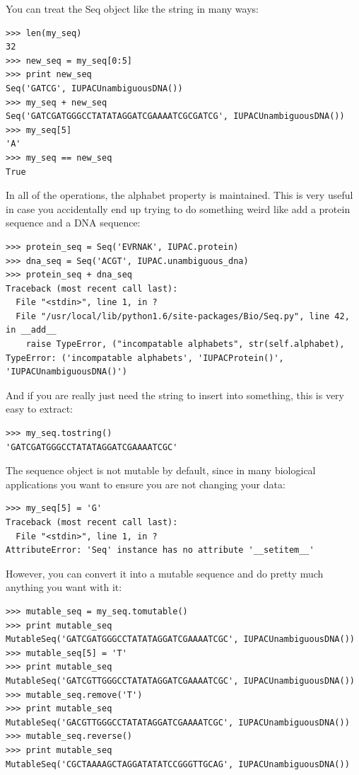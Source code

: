 \documentclass{report}
\begin{document}
You can treat the Seq object like the string in many ways:

\begin{verbatim}
>>> len(my_seq)
32
>>> new_seq = my_seq[0:5]
>>> print new_seq
Seq('GATCG', IUPACUnambiguousDNA())
>>> my_seq + new_seq
Seq('GATCGATGGGCCTATATAGGATCGAAAATCGCGATCG', IUPACUnambiguousDNA())
>>> my_seq[5]
'A'
>>> my_seq == new_seq
True
\end{verbatim}

In all of the operations, the alphabet property is maintained. This is very useful in case you accidentally end up trying to do something weird like add a protein sequence and a DNA sequence:

\begin{verbatim}
>>> protein_seq = Seq('EVRNAK', IUPAC.protein)
>>> dna_seq = Seq('ACGT', IUPAC.unambiguous_dna)
>>> protein_seq + dna_seq
Traceback (most recent call last):
  File "<stdin>", line 1, in ?
  File "/usr/local/lib/python1.6/site-packages/Bio/Seq.py", line 42, in __add__
    raise TypeError, ("incompatable alphabets", str(self.alphabet),
TypeError: ('incompatable alphabets', 'IUPACProtein()', 'IUPACUnambiguousDNA()')
\end{verbatim}

And if you are really just need the string to insert into something, this is very easy to extract:

\begin{verbatim}
>>> my_seq.tostring()
'GATCGATGGGCCTATATAGGATCGAAAATCGC'
\end{verbatim} 

The sequence object is not mutable by default, since in many biological applications you want to ensure you are not changing your data:

\begin{verbatim}
>>> my_seq[5] = 'G'
Traceback (most recent call last):
  File "<stdin>", line 1, in ?
AttributeError: 'Seq' instance has no attribute '__setitem__'
\end{verbatim}

However, you can convert it into a mutable sequence and do pretty much anything you want with it:

\begin{verbatim}
>>> mutable_seq = my_seq.tomutable()
>>> print mutable_seq
MutableSeq('GATCGATGGGCCTATATAGGATCGAAAATCGC', IUPACUnambiguousDNA())
>>> mutable_seq[5] = 'T'
>>> print mutable_seq
MutableSeq('GATCGTTGGGCCTATATAGGATCGAAAATCGC', IUPACUnambiguousDNA())
>>> mutable_seq.remove('T')
>>> print mutable_seq
MutableSeq('GACGTTGGGCCTATATAGGATCGAAAATCGC', IUPACUnambiguousDNA())
>>> mutable_seq.reverse()
>>> print mutable_seq
MutableSeq('CGCTAAAAGCTAGGATATATCCGGGTTGCAG', IUPACUnambiguousDNA())
\end{verbatim}
\end{document}

